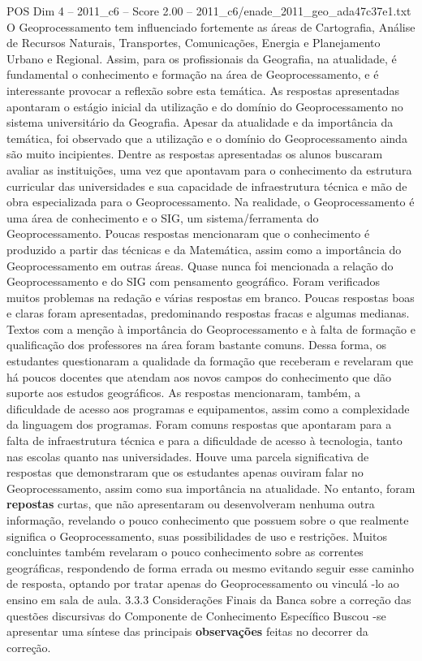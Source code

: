 \begin{textsample}{POS Dim 4 – 2011\_c6 – Score 2.00 – 2011\_c6/enade\_2011\_geo\_ada47c37e1.txt}
O Geoprocessamento tem influenciado fortemente as áreas de Cartografia, Análise de Recursos Naturais, Transportes, Comunicações, Energia e Planejamento Urbano e Regional.
Assim, para os profissionais da Geografia, na atualidade, é fundamental o conhecimento e formação na área de Geoprocessamento, e é interessante provocar a reflexão sobre esta temática.
As respostas apresentadas apontaram o estágio inicial da utilização e do domínio do Geoprocessamento no sistema universitário da Geografia.
Apesar da atualidade e da importância da temática, foi observado que a utilização e o domínio do Geoprocessamento ainda são muito incipientes.
Dentre as respostas apresentadas os alunos buscaram avaliar as instituições, uma vez que apontavam para o conhecimento da estrutura curricular das universidades e sua capacidade de infraestrutura técnica e mão de obra especializada para o Geoprocessamento.
Na realidade, o Geoprocessamento é uma área de conhecimento e o SIG, um sistema/ferramenta do Geoprocessamento.
Poucas respostas mencionaram que o conhecimento é produzido a partir das técnicas e da Matemática, assim como a importância do Geoprocessamento em outras áreas.
Quase nunca foi mencionada a relação do Geoprocessamento e do SIG com pensamento geográfico.
Foram verificados muitos problemas na redação e várias respostas em branco.
Poucas respostas boas e claras foram apresentadas, predominando respostas fracas e algumas medianas.
Textos com a menção à importância do Geoprocessamento e à falta de formação e qualificação dos professores na área foram bastante comuns.
Dessa forma, os estudantes questionaram a qualidade da formação que receberam e revelaram que há poucos docentes que atendam aos novos campos do conhecimento que dão suporte aos estudos geográficos.
As respostas mencionaram, também, a dificuldade de acesso aos programas e equipamentos, assim como a complexidade da linguagem dos programas.
Foram comuns respostas que apontaram para a falta de infraestrutura técnica e para a dificuldade de acesso à tecnologia, tanto nas escolas quanto nas universidades.
Houve uma parcela significativa de respostas que demonstraram que os estudantes apenas ouviram falar no Geoprocessamento, assim como sua importância na atualidade.
No entanto, foram \textbf{repostas} curtas, que não apresentaram ou desenvolveram nenhuma outra informação, revelando o pouco conhecimento que possuem sobre o que realmente significa o Geoprocessamento, suas possibilidades de uso e restrições.
Muitos concluintes também revelaram o pouco conhecimento sobre as correntes geográficas, respondendo de forma errada ou mesmo evitando seguir esse caminho de resposta, optando por tratar apenas do Geoprocessamento ou vinculá -lo ao ensino em sala de aula. 3.3.3 Considerações Finais da Banca sobre a correção das questões discursivas do Componente de Conhecimento Específico Buscou -se apresentar uma síntese das principais \textbf{observações} feitas no decorrer da correção.

\end{textsample}
